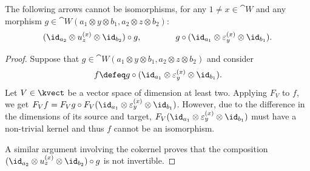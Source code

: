 \begin{corollary}\label{cor: structure-of-isos}
  The following arrows cannot be isomorphisms,
  for any \(1 \neq x \in\cat{W}\) and any morphism \(g \in \cat{W}(a_1 \otimes y \otimes b_1,a_2 \otimes z \otimes b_2)\):
  \[
    (\id_{a_2} \otimes u^{(x)}_{z} \otimes \id_{b_2}) \circ g,
    \qquad \qquad
    g \circ (\id_{a_1} \otimes \varepsilon^{(x)}_{y} \otimes \id_{b_1}).
  \]
\end{corollary}
\begin{proof}
  Suppose that \(g \in \cat{W}(a_1 \otimes y \otimes b_1,a_2 \otimes z \otimes b_2)\)
  and consider
  \[
    f \defeq g \circ (\id_{a_1} \otimes \varepsilon^{(x)}_{y} \otimes \id_{b_1}).
  \]
  Let \(V\in\kvect\) be a vector space of dimension at least two.
  Applying \(F_V\) to \(f\), we get
  \(F_{V}f = F_{V}g \circ F_{V}(\id_{a_1} \otimes \varepsilon^{(x)}_{y} \otimes \id_{b_1})\).
  However, due to the difference in the dimensions of its source and target,
  \(F_{V}(\id_{a_1} \otimes \varepsilon^{(x)}_{y} \otimes \id_{b_1})\) must have a non-trivial kernel and thus \(f\) cannot be an isomorphism.

  A similar argument involving the cokernel proves that the composition
  \((\id_{a_2} \otimes u^{(x)}_{z} \otimes \id_{b_2}) \circ g\)
  is not invertible.
\end{proof}


